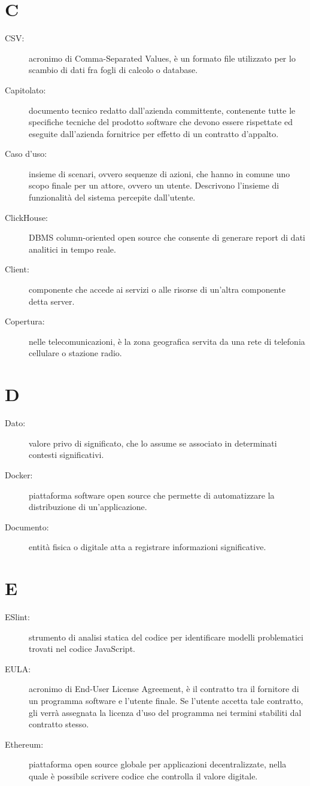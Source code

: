 \documentclass{article}
\begin{document}
	\section{C}
	\begin{description}
		\item[CSV:] acronimo di Comma-Separated Values, è un formato file utilizzato per lo scambio di dati fra fogli di calcolo o database.
		\item[Capitolato:] documento tecnico redatto dall'azienda committente, contenente tutte le specifiche tecniche del prodotto software che devono essere rispettate ed eseguite dall'azienda fornitrice per effetto di un contratto d'appalto.
		\item[Caso d'uso:] insieme di scenari, ovvero sequenze di azioni, che hanno in comune uno scopo finale per un attore, ovvero un utente. Descrivono l'insieme di funzionalità del sistema percepite dall'utente.
		\item[ClickHouse:] DBMS column-oriented open source che consente di generare report di dati analitici in tempo reale.
		\item[Client:] componente che accede ai servizi o alle risorse di un'altra componente detta server.
		\item[Copertura:] nelle telecomunicazioni, è la zona geografica servita da una rete di telefonia cellulare o stazione radio.
	\end{description}
	\newpage
	\section{D}
	\begin{description}
		\item[Dato:] valore privo di significato, che lo assume se associato in determinati contesti significativi.
		\item[Docker:] piattaforma software open source che permette di automatizzare la distribuzione di un'applicazione.
		\item[Documento:] entità fisica o digitale atta a registrare informazioni significative.
	\end{description}
	\newpage
	\section{E}
	\begin{description}
		\item[ESlint:] strumento di analisi statica del codice per identificare modelli problematici trovati nel codice JavaScript.
		\item[EULA:] acronimo di End-User License Agreement, è il contratto tra il fornitore di un programma software e l'utente finale. Se l'utente accetta tale contratto, gli verrà assegnata la licenza d'uso del programma nei termini stabiliti dal contratto stesso.
		\item[Ethereum:] piattaforma open source globale per applicazioni decentralizzate, nella quale è possibile scrivere codice che controlla il valore digitale.
	\end{description}
	\newpage
\end{document}
